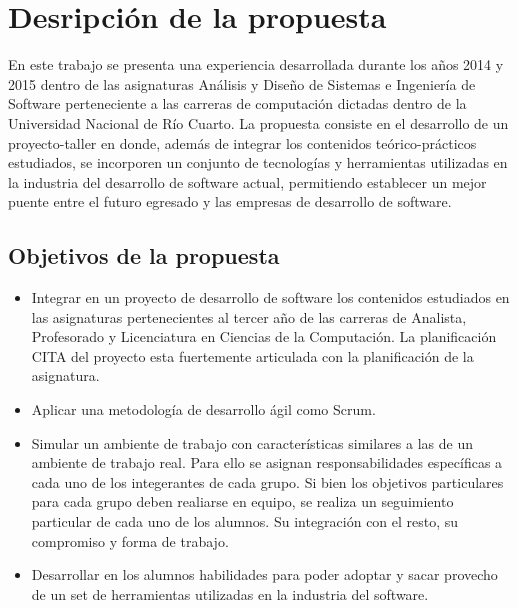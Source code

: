 \section{Desripción de la propuesta} \label{propuesta}

En este trabajo se presenta una experiencia desarrollada durante los años 2014 y 2015 dentro de las asignaturas Análisis y Diseño de
Sistemas e 
Ingeniería de Software perteneciente a las carreras de computación dictadas dentro de la Universidad Nacional de Río Cuarto.
La propuesta consiste 
en el desarrollo de un proyecto-taller en donde, además de integrar los contenidos teórico-prácticos 
estudiados, se incorporen un conjunto de tecnologías y herramientas utilizadas en la industria del desarrollo de software actual,
permitiendo
establecer un mejor
puente entre el futuro egresado y las empresas de desarrollo de software. \\


\subsection{Objetivos de la propuesta}

 \begin{itemize}
 \item Integrar en un  proyecto de desarrollo de software los contenidos estudiados en las asignaturas pertenecientes al tercer 
   año de las carreras de Analista, Profesorado y  Licenciatura en Ciencias de la Computación. La planificación CITA del proyecto esta 
   fuertemente articulada con la planificación de la asignatura.
 \item Aplicar una metodología de desarrollo ágil como Scrum.
 \item Simular un ambiente de trabajo con características similares a las de un ambiente de trabajo real. Para ello se asignan responsabilidades
 específicas a cada uno de los integerantes de cada grupo. Si bien los objetivos particulares para cada grupo deben realiarse en equipo, 
 se realiza un seguimiento particular de cada uno de los alumnos. Su integración con el resto, su compromiso y forma de trabajo.
 \item Desarrollar en los alumnos habilidades para poder adoptar y sacar provecho de un set de herramientas utilizadas en la industria del software. 
 
 \end{itemize}
 
